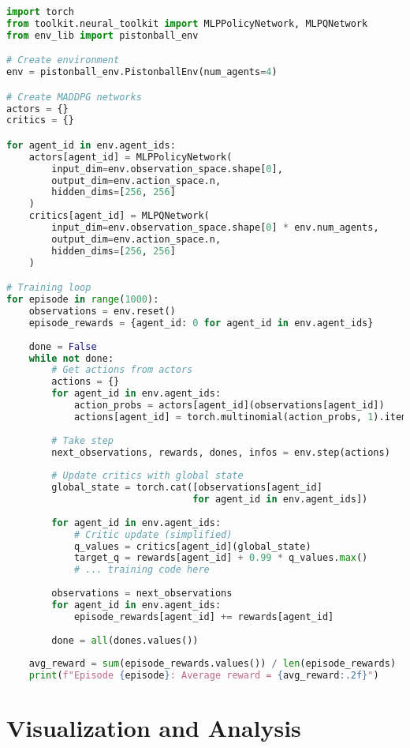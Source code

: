 \begin{lstlisting}[language=python, caption=MADDPG Training Example]
import torch
from toolkit.neural_toolkit import MLPPolicyNetwork, MLPQNetwork
from env_lib import pistonball_env

# Create environment
env = pistonball_env.PistonballEnv(num_agents=4)

# Create MADDPG networks
actors = {}
critics = {}

for agent_id in env.agent_ids:
    actors[agent_id] = MLPPolicyNetwork(
        input_dim=env.observation_space.shape[0],
        output_dim=env.action_space.n,
        hidden_dims=[256, 256]
    )
    critics[agent_id] = MLPQNetwork(
        input_dim=env.observation_space.shape[0] * env.num_agents,
        output_dim=env.action_space.n,
        hidden_dims=[256, 256]
    )

# Training loop
for episode in range(1000):
    observations = env.reset()
    episode_rewards = {agent_id: 0 for agent_id in env.agent_ids}
    
    done = False
    while not done:
        # Get actions from actors
        actions = {}
        for agent_id in env.agent_ids:
            action_probs = actors[agent_id](observations[agent_id])
            actions[agent_id] = torch.multinomial(action_probs, 1).item()
        
        # Take step
        next_observations, rewards, dones, infos = env.step(actions)
        
        # Update critics with global state
        global_state = torch.cat([observations[agent_id] 
                                 for agent_id in env.agent_ids])
        
        for agent_id in env.agent_ids:
            # Critic update (simplified)
            q_values = critics[agent_id](global_state)
            target_q = rewards[agent_id] + 0.99 * q_values.max()
            # ... training code here
        
        observations = next_observations
        for agent_id in env.agent_ids:
            episode_rewards[agent_id] += rewards[agent_id]
        
        done = all(dones.values())
    
    avg_reward = sum(episode_rewards.values()) / len(episode_rewards)
    print(f"Episode {episode}: Average reward = {avg_reward:.2f}")
\end{lstlisting}

\section{Visualization and Analysis}

